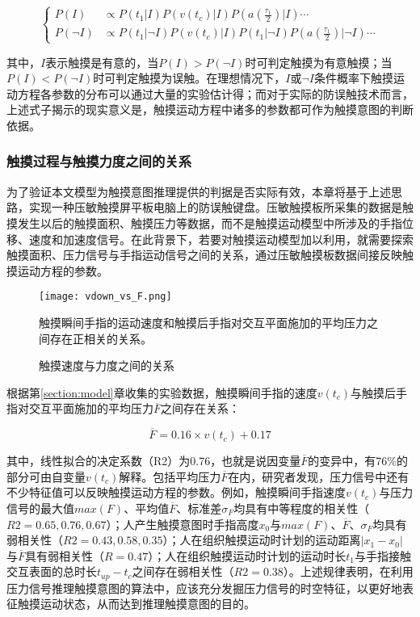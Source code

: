 \begin{equation}
	\begin{cases}
		P(I) & \propto P(t_1\vert I)P(v(t_c)\vert I)P(a(\frac{\tau_1}{2})\vert I)\cdots \\
		P(\neg I) & \propto P(t_1\vert \neg I)P(v(t_c)\vert I)P(t_1\vert \neg I)P(a(\frac{\tau_1}{2})\vert \neg I)\cdots
	\end{cases}
\end{equation}

其中，$I$表示触摸是有意的，当$P(I)>P(\neg I)$时可判定触摸为有意触摸；当$P(I)<P(\neg I)$时可判定触摸为误触。在理想情况下，$I$或$\neg I$条件概率下触摸运动方程各参数的分布可以通过大量的实验估计得；而对于实际的防误触技术而言，上述式子揭示的现实意义是，触摸运动方程中诸多的参数都可作为触摸意图的判断依据。

\subsubsection{触摸过程与触摸力度之间的关系}

为了验证本文模型为触摸意图推理提供的判据是否实际有效，本章将基于上述思路，实现一种压敏触摸屏平板电脑上的防误触键盘。压敏触摸板所采集的数据是触摸发生以后的触摸面积、触摸压力等数据，而不是触摸运动模型中所涉及的手指位移、速度和加速度信号。在此背景下，若要对触摸运动模型加以利用，就需要探索触摸面积、压力信号与手指运动信号之间的关系，通过压敏触摸板数据间接反映触摸运动方程的参数。

\begin{figure}
	\centering
	\texttt{[image: vdown\_vs\_F.png]}
	\caption*{触摸瞬间手指的运动速度和触摸后手指对交互平面施加的平均压力之间存在正相关的关系。}
	\caption{触摸速度与力度之间的关系}
	\label{fig:vdown_vs_F}
\end{figure}

根据第\ref{section:model}章收集的实验数据，触摸瞬间手指的速度$v(t_c)$与触摸后手指对交互平面施加的平均压力$\overline{F}$之间存在关系：

\begin{equation}
	\overline{F}=0.16\times v(t_c)+0.17
\end{equation}

其中，线性拟合的决定系数（R2）为0.76，也就是说因变量$\overline{F}$的变异中，有76\%的部分可由自变量$v(t_c)$解释。包括平均压力$\overline{F}$在内，研究者发现，压力信号中还有不少特征值可以反映触摸运动方程的参数。例如，触摸瞬间手指速度$v(t_c)$与压力信号的最大值$max(F)$、平均值$\overline{F}$、标准差$\sigma_F$均具有中等程度的相关性（$R2=0.65,0.76,0.67$）；人产生触摸意图时手指高度$x_0$与$max(F)$、$\overline{F}$、$\sigma_F$均具有弱相关性（$R2=0.43,0.58,0.35$）；人在组织触摸运动时计划的运动距离$\vert x_1-x_0 \vert$与$\overline{F}$具有弱相关性（$R=0.47$）；人在组织触摸运动时计划的运动时长$t_1$与手指接触交互表面的总时长$t_{up}-t_c$之间存在弱相关性（$R2=0.38$）。上述规律表明，在利用压力信号推理触摸意图的算法中，应该充分发掘压力信号的时空特征，以更好地表征触摸运动状态，从而达到推理触摸意图的目的。

